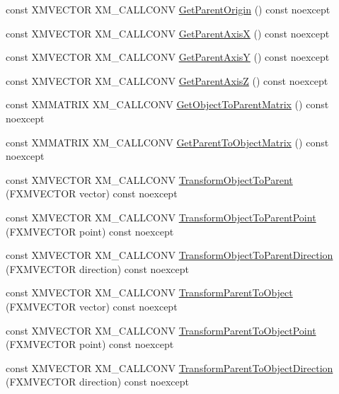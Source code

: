 \begin{DoxyCompactItemize}
\item 
const X\+M\+V\+E\+C\+T\+OR X\+M\+\_\+\+C\+A\+L\+L\+C\+O\+NV \mbox{\hyperlink{classmage_1_1_s_q_t_transform3_d_ae24049b2893e77b6dbefff3bc1519ef2}{Get\+Parent\+Origin}} () const noexcept
\item 
const X\+M\+V\+E\+C\+T\+OR X\+M\+\_\+\+C\+A\+L\+L\+C\+O\+NV \mbox{\hyperlink{classmage_1_1_s_q_t_transform3_d_a5840221311ae851bf80279f355a5fe49}{Get\+Parent\+AxisX}} () const noexcept
\item 
const X\+M\+V\+E\+C\+T\+OR X\+M\+\_\+\+C\+A\+L\+L\+C\+O\+NV \mbox{\hyperlink{classmage_1_1_s_q_t_transform3_d_a08ad3d7fb3443a83767a8ec0c09706a3}{Get\+Parent\+AxisY}} () const noexcept
\item 
const X\+M\+V\+E\+C\+T\+OR X\+M\+\_\+\+C\+A\+L\+L\+C\+O\+NV \mbox{\hyperlink{classmage_1_1_s_q_t_transform3_d_aa78fb45f9bf9972ff183030b592de719}{Get\+Parent\+AxisZ}} () const noexcept
\item 
const X\+M\+M\+A\+T\+R\+IX X\+M\+\_\+\+C\+A\+L\+L\+C\+O\+NV \mbox{\hyperlink{classmage_1_1_s_q_t_transform3_d_a4d4b8809174f1d23d4ca230d6744276e}{Get\+Object\+To\+Parent\+Matrix}} () const noexcept
\item 
const X\+M\+M\+A\+T\+R\+IX X\+M\+\_\+\+C\+A\+L\+L\+C\+O\+NV \mbox{\hyperlink{classmage_1_1_s_q_t_transform3_d_ababf4d1b4bbb747d495b0412cd16fb66}{Get\+Parent\+To\+Object\+Matrix}} () const noexcept
\item 
const X\+M\+V\+E\+C\+T\+OR X\+M\+\_\+\+C\+A\+L\+L\+C\+O\+NV \mbox{\hyperlink{classmage_1_1_s_q_t_transform3_d_a78f199eb1df5a0d14d21bb5f2d2cb320}{Transform\+Object\+To\+Parent}} (F\+X\+M\+V\+E\+C\+T\+OR vector) const noexcept
\item 
const X\+M\+V\+E\+C\+T\+OR X\+M\+\_\+\+C\+A\+L\+L\+C\+O\+NV \mbox{\hyperlink{classmage_1_1_s_q_t_transform3_d_a5bf23f9530549a133729efbb2ada306c}{Transform\+Object\+To\+Parent\+Point}} (F\+X\+M\+V\+E\+C\+T\+OR point) const noexcept
\item 
const X\+M\+V\+E\+C\+T\+OR X\+M\+\_\+\+C\+A\+L\+L\+C\+O\+NV \mbox{\hyperlink{classmage_1_1_s_q_t_transform3_d_aa32b13722dba2fb2a10ee9abb852219d}{Transform\+Object\+To\+Parent\+Direction}} (F\+X\+M\+V\+E\+C\+T\+OR direction) const noexcept
\item 
const X\+M\+V\+E\+C\+T\+OR X\+M\+\_\+\+C\+A\+L\+L\+C\+O\+NV \mbox{\hyperlink{classmage_1_1_s_q_t_transform3_d_a1e4ec9b36b1cc9b90e51b33977d4aff0}{Transform\+Parent\+To\+Object}} (F\+X\+M\+V\+E\+C\+T\+OR vector) const noexcept
\item 
const X\+M\+V\+E\+C\+T\+OR X\+M\+\_\+\+C\+A\+L\+L\+C\+O\+NV \mbox{\hyperlink{classmage_1_1_s_q_t_transform3_d_a243e62b2245f07f9b57a63cc462b0516}{Transform\+Parent\+To\+Object\+Point}} (F\+X\+M\+V\+E\+C\+T\+OR point) const noexcept
\item 
const X\+M\+V\+E\+C\+T\+OR X\+M\+\_\+\+C\+A\+L\+L\+C\+O\+NV \mbox{\hyperlink{classmage_1_1_s_q_t_transform3_d_a55ca93f4e7d3e038985fdaa221f091f3}{Transform\+Parent\+To\+Object\+Direction}} (F\+X\+M\+V\+E\+C\+T\+OR direction) const noexcept
\end{DoxyCompactItemize}
